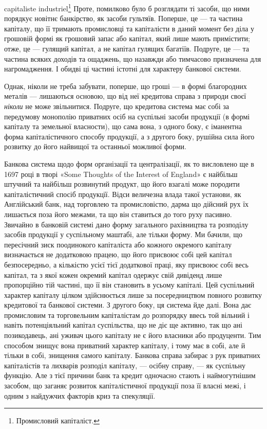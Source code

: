 \parcont{}  %
capitaliste industriel\footnote*{
Промисловий капіталіст. 
} Проте, помилково було б розглядати ті засоби, що ними
порядкує новітнє банкірство, як засоби гультяїв. Поперше, це — та частина
капіталу, що її тримають промисловці та капіталісти в даний момент без діла
у грошовій формі як грошовий запас або капітал, який лише мають примістити;
отже, це — гулящий капітал, а не капітал гулящих багатіїв. Подруге, це — та
частина всяких доходів та ощаджень, що назавжди або тимчасово призначена
для нагромадження. І обидві ці частині істотні для характеру банкової системи.

Однак, ніколи не треба забувати, поперше, що гроші — в формі благородних
металів — лишаються основою, що від неї кредитова справа з природи
своєї \emph{ніколи} не може звільнитися. Подруге, що кредитова система має собі
за передумову монополію приватних осіб на суспільні засоби продукції (в формі
капіталу та земельної власности), що сама вона, з одного боку, є іманентна
форма капіталістичного способу продукції, а з другого боку, рушійна сила його
розвитку до його найвищої та останньої можливої форми.

Банкова система щодо форм організації та централізації, як то висловлено
ще в 1697 році в творі «Some Thoughts of the Interest of England» є найбільш
штучний та найбільш розвинутий продукт, що його взагалі може породити
капіталістичний спосіб продукцїї. Відси величезна влада такої установи,
як Англійський банк, над торговлею та промисловістю, дарма що дійсний рух
їх лишається поза його межами, та що він ставиться до того руху пасивно.
Звичайно в банковій системі дано форму загального рахівництва та розподілу
засобів продукції у суспільному маштабі, але тільки форму. Ми бачили, що пересічний
зиск поодинокого капіталіста або кожного окремого капіталу визначається
не додатковою працею, що його присвоює собі цей капітал безпосередньо,
а кількістю усієї тієї додаткової праці, яку присвоює собі весь капітал, та з якої
кожен окремий капітал одержує свій дивіденд лише пропорційно тій частині, що
її він становить в усьому капіталі. Цей суспільний характер капіталу цілком
здійснюється лише за посередництвом повного розвитку кредитової та банкової
системи. З другого боку, ця система йде далі. Вона дає промисловим та торговельним
капіталістам до розпорядку ввесь той вільний і навіть потенціяльний
капітал суспільства, що не діє ще активно, так що ані позикодавець, ані уживач
цього капіталу не є його власники або продуценти. Тим способом знищує
вона приватний характер капіталу, і тому має в собі, але й тільки в собі, знищення
самого капіталу. Банкова справа забирає з рук приватних капіталістів
та лихварів розподіл капіталу, — осібну справу, — як суспільну функцію. Але
з тієї причини банк та кредит одночасно стають і наймогутнішим засобом, що
заганяє розвиток капіталістичної продукції поза її власні межі, і одним з найдужчих
факторів криз та спекуляції.

